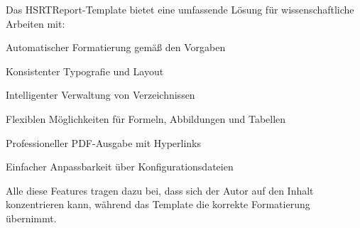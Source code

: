 Das HSRTReport-Template bietet eine umfassende Lösung für wissenschaftliche Arbeiten mit:
\begin{listenabsatz}
	\item Automatischer Formatierung gemäß den Vorgaben
	\item Konsistenter Typografie und Layout
	\item Intelligenter Verwaltung von Verzeichnissen
	\item Flexiblen Möglichkeiten für Formeln, Abbildungen und Tabellen
	\item Professioneller PDF-Ausgabe mit Hyperlinks
	\item Einfacher Anpassbarkeit über Konfigurationsdateien
\end{listenabsatz}

Alle diese Features tragen dazu bei, dass sich der Autor auf den Inhalt konzentrieren kann, während das Template die korrekte Formatierung übernimmt.

